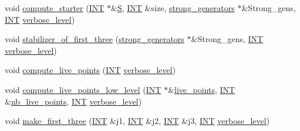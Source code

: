 \begin{DoxyCompactItemize}
\item 
void \mbox{\hyperlink{classrecoordinatize_a274b399821488e5f6fb1adfbc8f8ebac}{compute\+\_\+starter}} (\mbox{\hyperlink{galois_8h_a09fddde158a3a20bd2dcadb609de11dc}{I\+NT}} $\ast$\&\mbox{\hyperlink{simeon_8_c_adab47f8243f1b5a2c31df2535d6b37d0}{S}}, \mbox{\hyperlink{galois_8h_a09fddde158a3a20bd2dcadb609de11dc}{I\+NT}} \&size, \mbox{\hyperlink{classstrong__generators}{strong\+\_\+generators}} $\ast$\&Strong\+\_\+gens, \mbox{\hyperlink{galois_8h_a09fddde158a3a20bd2dcadb609de11dc}{I\+NT}} \mbox{\hyperlink{simeon_8_c_a818073fbcc2f439e7c56952f67386122}{verbose\+\_\+level}})
\item 
void \mbox{\hyperlink{classrecoordinatize_ae8a24e776a57f0ac4923f6ed1d1db6e6}{stabilizer\+\_\+of\+\_\+first\+\_\+three}} (\mbox{\hyperlink{classstrong__generators}{strong\+\_\+generators}} $\ast$\&Strong\+\_\+gens, \mbox{\hyperlink{galois_8h_a09fddde158a3a20bd2dcadb609de11dc}{I\+NT}} \mbox{\hyperlink{simeon_8_c_a818073fbcc2f439e7c56952f67386122}{verbose\+\_\+level}})
\item 
void \mbox{\hyperlink{classrecoordinatize_afa52f45535215f825be7e620bc44b7d7}{compute\+\_\+live\+\_\+points}} (\mbox{\hyperlink{galois_8h_a09fddde158a3a20bd2dcadb609de11dc}{I\+NT}} \mbox{\hyperlink{simeon_8_c_a818073fbcc2f439e7c56952f67386122}{verbose\+\_\+level}})
\item 
void \mbox{\hyperlink{classrecoordinatize_ac87da537e6ac771351b530475278253e}{compute\+\_\+live\+\_\+points\+\_\+low\+\_\+level}} (\mbox{\hyperlink{galois_8h_a09fddde158a3a20bd2dcadb609de11dc}{I\+NT}} $\ast$\&\mbox{\hyperlink{classrecoordinatize_aeb68174bcf3297e6972d2e825cd0a24e}{live\+\_\+points}}, \mbox{\hyperlink{galois_8h_a09fddde158a3a20bd2dcadb609de11dc}{I\+NT}} \&\mbox{\hyperlink{classrecoordinatize_a7d60c59e96944c7f8e8ff1c5c8da3d72}{nb\+\_\+live\+\_\+points}}, \mbox{\hyperlink{galois_8h_a09fddde158a3a20bd2dcadb609de11dc}{I\+NT}} \mbox{\hyperlink{simeon_8_c_a818073fbcc2f439e7c56952f67386122}{verbose\+\_\+level}})
\item 
void \mbox{\hyperlink{classrecoordinatize_ad84ccf8f6e33a887fbd460b87df278bd}{make\+\_\+first\+\_\+three}} (\mbox{\hyperlink{galois_8h_a09fddde158a3a20bd2dcadb609de11dc}{I\+NT}} \&j1, \mbox{\hyperlink{galois_8h_a09fddde158a3a20bd2dcadb609de11dc}{I\+NT}} \&j2, \mbox{\hyperlink{galois_8h_a09fddde158a3a20bd2dcadb609de11dc}{I\+NT}} \&j3, \mbox{\hyperlink{galois_8h_a09fddde158a3a20bd2dcadb609de11dc}{I\+NT}} \mbox{\hyperlink{simeon_8_c_a818073fbcc2f439e7c56952f67386122}{verbose\+\_\+level}})
\end{DoxyCompactItemize}

